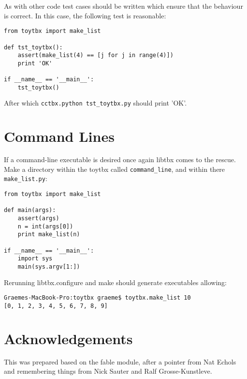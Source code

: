 \documentclass[a4paper, 11pt]{article}
\begin{document}
As with other code test cases should be written which ensure that the behaviour is correct. In this case, the following test is reasonable:

{\small
\begin{verbatim}
from toytbx import make_list

def tst_toytbx():
    assert(make_list(4) == [j for j in range(4)])
    print 'OK'

if __name__ == '__main__':
    tst_toytbx()
\end{verbatim}
}

After which \verb|cctbx.python tst_toytbx.py| should print 'OK'.

\section{Command Lines}

If a command-line executable is desired once again libtbx comes to the rescue. Make a directory within the toytbx called \verb|command_line|, and within there \verb|make_list.py|:

{\small
\begin{verbatim}
from toytbx import make_list

def main(args):
    assert(args)
    n = int(args[0])
    print make_list(n)

if __name__ == '__main__':
    import sys
    main(sys.argv[1:])
\end{verbatim}
}

Rerunning libtbx.configure and make should generate executables allowing:

{\small
\begin{verbatim}
Graemes-MacBook-Pro:toytbx graeme$ toytbx.make_list 10
[0, 1, 2, 3, 4, 5, 6, 7, 8, 9]
\end{verbatim}
}

\section{Acknowledgements}

This was prepared based on the fable module, after a pointer from Nat Echols and remembering things from Nick Sauter and Ralf Grosse-Kunstleve.
\end{document}
